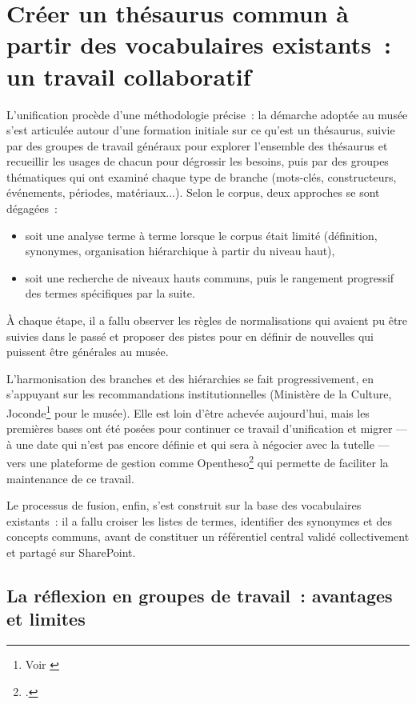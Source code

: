 \section{\label{III-B-2}Créer un thésaurus commun à partir des vocabulaires existants~: un travail collaboratif}

L’unification procède d’une méthodologie précise~: la démarche adoptée au musée s’est articulée autour d’une formation initiale sur ce qu’est un thésaurus, suivie par des groupes de travail généraux pour explorer l'ensemble des thésaurus et recueillir les usages de chacun pour dégrossir les besoins, puis par des groupes thématiques qui ont examiné chaque type de branche (mots-clés, constructeurs, événements, périodes, matériaux...). Selon le corpus, deux approches se sont dégagées~: 
\begin{itemize}
	\item soit une analyse terme à terme lorsque le corpus était limité (définition, synonymes, organisation hiérarchique à partir du niveau haut),
	\item soit une recherche de niveaux hauts communs, puis le rangement progressif des termes spécifiques par la suite.
\end{itemize}
À chaque étape, il a fallu observer les règles de normalisations qui avaient pu être suivies dans le passé et proposer des pistes pour en définir de nouvelles qui puissent être générales au musée.

L’harmonisation des branches et des hiérarchies se fait progressivement, en s’appuyant sur les recommandations institutionnelles (Ministère de la Culture, Joconde\footnote{Voir \cite{ministeredelacultureVocabulairesScientifiquesService2014}} pour le musée). Elle est loin d'être achevée aujourd'hui, mais les premières bases ont été posées pour continuer ce travail d'unification et migrer --- à une date qui n'est pas encore définie et qui sera à négocier avec la tutelle --- vers une plateforme de gestion comme Opentheso\footcite{OpenThesoa} qui permette de faciliter la maintenance de ce travail.

Le processus de fusion, enfin, s’est construit sur la base des vocabulaires existants~: il a fallu croiser les listes de termes, identifier des synonymes et des concepts communs, avant de constituer un référentiel central validé collectivement et partagé sur SharePoint.

\subsection{La réflexion en groupes de travail~: avantages et limites}

